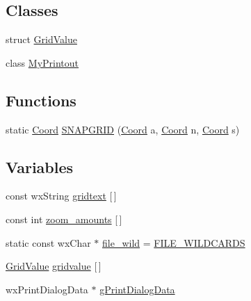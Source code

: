 \subsection*{Classes}
\begin{DoxyCompactItemize}
\item 
struct \hyperlink{a00106}{Grid\-Value}
\item 
class \hyperlink{a00113}{My\-Printout}
\end{DoxyCompactItemize}
\subsection*{Functions}
\begin{DoxyCompactItemize}
\item 
static \hyperlink{a00216_acd9dae57b712df0e2d3588c0c4798c11}{Coord} \hyperlink{a00226_afd4efb474e1d83eb01eedd1fcc6dbf0a}{S\-N\-A\-P\-G\-R\-I\-D} (\hyperlink{a00216_acd9dae57b712df0e2d3588c0c4798c11}{Coord} a, \hyperlink{a00216_acd9dae57b712df0e2d3588c0c4798c11}{Coord} n, \hyperlink{a00216_acd9dae57b712df0e2d3588c0c4798c11}{Coord} s)
\end{DoxyCompactItemize}
\subsection*{Variables}
\begin{DoxyCompactItemize}
\item 
const wx\-String \hyperlink{a00226_a78f09467cace2629c2a2374a7f4bdc07}{gridtext} \mbox{[}$\,$\mbox{]}
\item 
const int \hyperlink{a00226_a78b0dfa6de03f88325ba95ae25f33320}{zoom\-\_\-amounts} \mbox{[}$\,$\mbox{]}
\item 
static const wx\-Char $\ast$ \hyperlink{a00226_a4841d82d107bf3e5331296d3527b192d}{file\-\_\-wild} = \hyperlink{a00237_a679ca74e08219209b5fd011946a83b62}{F\-I\-L\-E\-\_\-\-W\-I\-L\-D\-C\-A\-R\-D\-S}
\item 
\hyperlink{a00106}{Grid\-Value} \hyperlink{a00226_a75782416c96d40b05fd547805f028dbd}{gridvalue} \mbox{[}$\,$\mbox{]}
\item 
wx\-Print\-Dialog\-Data $\ast$ \hyperlink{a00226_a896ed5b078417657f1ceef1e87abe705}{g\-Print\-Dialog\-Data}
\end{DoxyCompactItemize}


